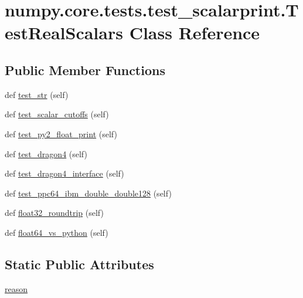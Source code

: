 \hypertarget{classnumpy_1_1core_1_1tests_1_1test__scalarprint_1_1TestRealScalars}{}\section{numpy.\+core.\+tests.\+test\+\_\+scalarprint.\+Test\+Real\+Scalars Class Reference}
\label{classnumpy_1_1core_1_1tests_1_1test__scalarprint_1_1TestRealScalars}
\subsection*{Public Member Functions}
\begin{DoxyCompactItemize}
\item 
def \hyperlink{classnumpy_1_1core_1_1tests_1_1test__scalarprint_1_1TestRealScalars_a3adcb9fd583774aa085c21fc5ce1da85}{test\+\_\+str} (self)
\item 
def \hyperlink{classnumpy_1_1core_1_1tests_1_1test__scalarprint_1_1TestRealScalars_ad227bfc61819ca4a30e0a5e156e4107c}{test\+\_\+scalar\+\_\+cutoffs} (self)
\item 
def \hyperlink{classnumpy_1_1core_1_1tests_1_1test__scalarprint_1_1TestRealScalars_aaeb8035903de052a004c4abc1ffac2ec}{test\+\_\+py2\+\_\+float\+\_\+print} (self)
\item 
def \hyperlink{classnumpy_1_1core_1_1tests_1_1test__scalarprint_1_1TestRealScalars_a47f111ecea768b896d50dab660a29195}{test\+\_\+dragon4} (self)
\item 
def \hyperlink{classnumpy_1_1core_1_1tests_1_1test__scalarprint_1_1TestRealScalars_a49621399f59262cade3b9e233187ee60}{test\+\_\+dragon4\+\_\+interface} (self)
\item 
def \hyperlink{classnumpy_1_1core_1_1tests_1_1test__scalarprint_1_1TestRealScalars_af5ae35f1414f185053baf01ff386b4d2}{test\+\_\+ppc64\+\_\+ibm\+\_\+double\+\_\+double128} (self)
\item 
def \hyperlink{classnumpy_1_1core_1_1tests_1_1test__scalarprint_1_1TestRealScalars_a425b30cdbfc1c88efd6ecefa7071c8ed}{float32\+\_\+roundtrip} (self)
\item 
def \hyperlink{classnumpy_1_1core_1_1tests_1_1test__scalarprint_1_1TestRealScalars_a7ed2b06eb547fae8dad769a3b9ec1888}{float64\+\_\+vs\+\_\+python} (self)
\end{DoxyCompactItemize}
\subsection*{Static Public Attributes}
\begin{DoxyCompactItemize}
\item 
\hyperlink{classnumpy_1_1core_1_1tests_1_1test__scalarprint_1_1TestRealScalars_a9c59166c2a69c0f59bfcb7158b69a774}{reason}
\end{DoxyCompactItemize}



